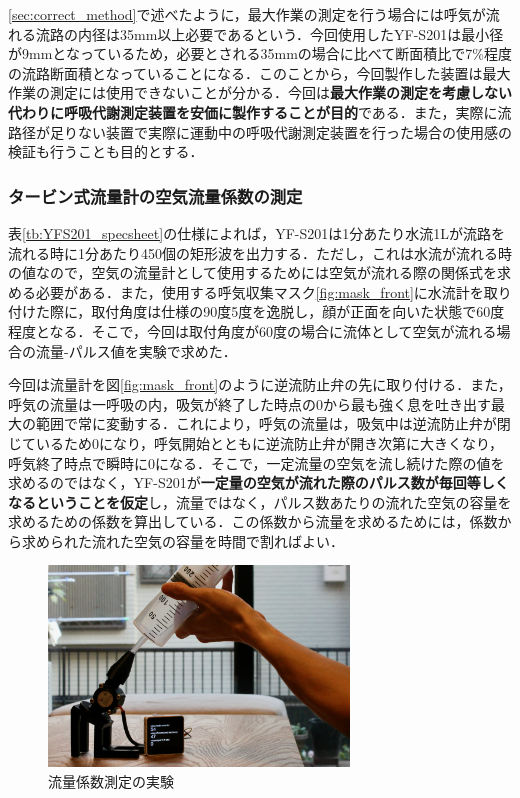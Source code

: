\ref{sec:correct_method}で述べたように，最大作業の測定を行う場合には呼気が流れる流路の内径は35mm以上必要であるという．今回使用したYF-S201は最小径が9mmとなっているため，必要とされる35mmの場合に比べて断面積比で7\%程度の流路断面積となっていることになる．このことから，今回製作した装置は最大作業の測定には使用できないことが分かる．今回は{\bf 最大作業の測定を考慮しない代わりに呼吸代謝測定装置を安価に製作することが目的}である．また，実際に流路径が足りない装置で実際に運動中の呼吸代謝測定装置を行った場合の使用感の検証も行うことも目的とする．

\subsubsection{タービン式流量計の空気流量係数の測定}
\label{sec:measuring_coefficient}

表\ref{tb:YFS201_specsheet}の仕様によれば，YF-S201は1分あたり水流1Lが流路を流れる時に1分あたり450個の矩形波を出力する．ただし，これは水流が流れる時の値なので，空気の流量計として使用するためには空気が流れる際の関係式を求める必要がある．また，使用する呼気収集マスク\ref{fig:mask_front}に水流計を取り付けた際に，取付角度は仕様の90度\pm5度を逸脱し，顔が正面を向いた状態で60度程度となる．そこで，今回は取付角度が60度の場合に流体として空気が流れる場合の流量-パルス値を実験で求めた．

今回は流量計を図\ref{fig:mask_front}のように逆流防止弁の先に取り付ける．また，呼気の流量は一呼吸の内，吸気が終了した時点の0から最も強く息を吐き出す最大の範囲で常に変動する．これにより，呼気の流量は，吸気中は逆流防止弁が閉じているため0になり，呼気開始とともに逆流防止弁が開き次第に大きくなり，呼気終了時点で瞬時に0になる．そこで，一定流量の空気を流し続けた際の値を求めるのではなく，YF-S201が{\bf 一定量の空気が流れた際のパルス数が毎回等しくなるということを仮定}し，流量ではなく，パルス数あたりの流れた空気の容量を求めるための係数を算出している．この係数から流量を求めるためには，係数から求められた流れた空気の容量を時間で割ればよい．

\begin{figure}[H]
  \begin{center}
    \includegraphics[width=8cm]{fig/flowsensor_calibrate}
    \caption{流量係数測定の実験}
    \label{fig:flowsensor_calibrate}
  \end{center}
\end{figure}

